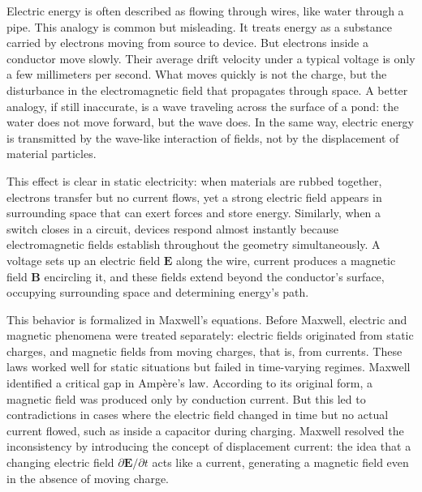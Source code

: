 Electric energy is often described as flowing through wires, like water through a pipe. This analogy is common but misleading. It treats energy as a substance carried by electrons moving from source to device. But electrons inside a conductor move slowly. Their average drift velocity under a typical voltage is only a few millimeters per second. What moves quickly is not the charge, but the disturbance in the electromagnetic field that propagates through space. A better analogy, if still inaccurate, is a wave traveling across the surface of a pond: the water does not move forward, but the wave does. In the same way, electric energy is transmitted by the wave-like interaction of fields, not by the displacement of material particles.

This effect is clear in static electricity: when materials are rubbed together, electrons transfer but no current flows, yet a strong electric field appears in surrounding space that can exert forces and store energy. Similarly, when a switch closes in a circuit, devices respond almost instantly because electromagnetic fields establish throughout the geometry simultaneously. A voltage sets up an electric field $\mathbf{E}$ along the wire, current produces a magnetic field $\mathbf{B}$ encircling it, and these fields extend beyond the conductor's surface, occupying surrounding space and determining energy's path.

This behavior is formalized in Maxwell's equations. Before Maxwell, electric and magnetic phenomena were treated separately: electric fields originated from static charges, and magnetic fields from moving charges, that is, from currents. These laws worked well for static situations but failed in time-varying regimes. Maxwell identified a critical gap in Ampère's law. According to its original form, a magnetic field was produced only by conduction current. But this led to contradictions in cases where the electric field changed in time but no actual current flowed, such as inside a capacitor during charging. Maxwell resolved the inconsistency by introducing the concept of displacement current: the idea that a changing electric field $\partial \mathbf{E}/\partial t$ acts like a current, generating a magnetic field even in the absence of moving charge.

